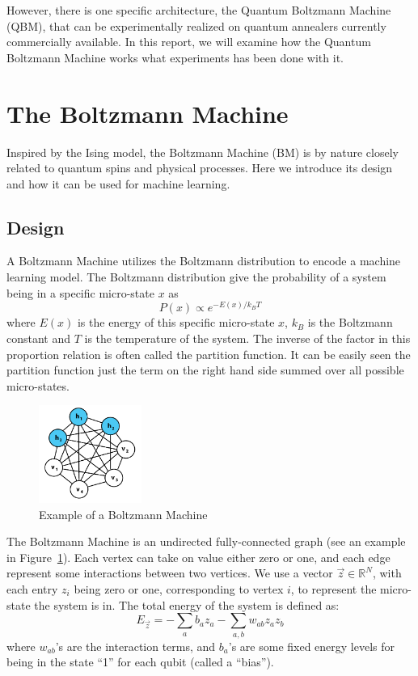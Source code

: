 \documentclass[letterpaper,11pt]{article}
\begin{document}
However, there is one specific architecture, the Quantum Boltzmann Machine (QBM), that can be experimentally realized on quantum annealers currently commercially available. In this report, we will examine how the Quantum Boltzmann Machine works what experiments has been done with it. 

\section{The Boltzmann Machine}

Inspired by the Ising model, the Boltzmann Machine (BM) is by nature closely related to quantum spins and physical processes. Here we introduce its design and how it can be used for machine learning. 

\subsection{Design}

A Boltzmann Machine utilizes the Boltzmann distribution to encode a machine learning model. The Boltzmann distribution give the probability of a system being in a specific micro-state $x$ as 
\begin{equation} \label{eq1}
P(x) \propto e ^ {- E(x)/k_B T}
\end{equation}
where $E(x)$ is the energy of this specific micro-state $x$, $k_B$ is the Boltzmann constant and $T$ is the temperature of the system. The inverse of the factor in this proportion relation is often called the partition function. It can be easily seen the partition function just the term on the right hand side summed over all possible micro-states. \par

\begin{figure}[h] 
\includegraphics[width=0.3\textwidth]{BM.png}
\centering
\caption{Example of a Boltzmann Machine}
\label{fig1}
\end{figure}

The Boltzmann Machine is an undirected fully-connected graph (see an example in Figure~\ref{fig1}). Each vertex can take on value either zero or one, and each edge represent some interactions between two vertices. We use a vector $\vec{z} \in \mathbb{R}^N$, with each entry $z_i$ being zero or one, corresponding to vertex $i$, to represent the micro-state the system is in. The total energy of the system is defined as: \begin{equation}
E_{\vec{z}} = - \sum_a b_a z_a - \sum_{a,b} w_{ab} z_a z_b
\end{equation}
where $w_{ab}$'s are the interaction terms, and $b_a$'s are some fixed energy levels for being in the state ``1'' for each qubit (called a ``bias''). \par
\end{document}
